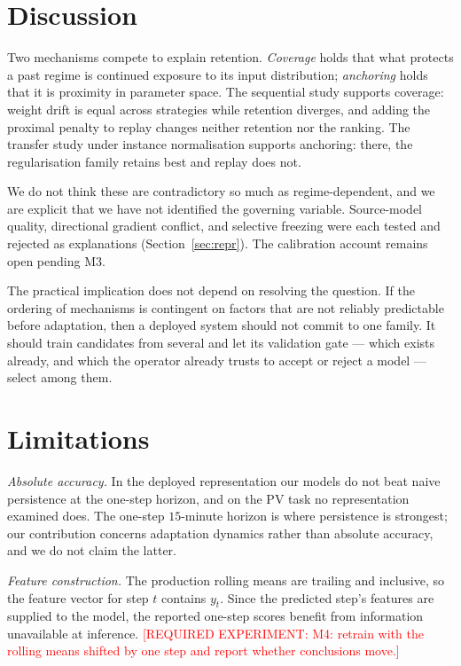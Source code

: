 \documentclass[journal]{IEEEtran}
\newcommand{\needexp}[1]{\textcolor{red}{[REQUIRED EXPERIMENT: #1]}}
\begin{document}
\section{Discussion}
\label{sec:discussion}

Two mechanisms compete to explain retention. \emph{Coverage} holds that what
protects a past regime is continued exposure to its input distribution;
\emph{anchoring} holds that it is proximity in parameter space. The sequential
study supports coverage: weight drift is equal across strategies while retention
diverges, and adding the proximal penalty to replay changes neither retention
nor the ranking. The transfer study under instance normalisation supports
anchoring: there, the regularisation family retains best and replay does not.

We do not think these are contradictory so much as regime-dependent, and we are
explicit that we have not identified the governing variable. Source-model
quality, directional gradient conflict, and selective freezing were each tested
and rejected as explanations (Section~\ref{sec:repr}). The calibration account
remains open pending M3.

The practical implication does not depend on resolving the question. If the
ordering of mechanisms is contingent on factors that are not reliably
predictable before adaptation, then a deployed system should not commit to one
family. It should train candidates from several and let its validation gate ---
which exists already, and which the operator already trusts to accept or reject
a model --- select among them.

\section{Limitations}
\label{sec:limits}

\emph{Absolute accuracy.} In the deployed representation our models do not beat
naive persistence at the one-step horizon, and on the PV task no representation
examined does. The one-step $15$-minute horizon is where persistence is
strongest; our contribution concerns adaptation dynamics rather than absolute
accuracy, and we do not claim the latter.

\emph{Feature construction.} The production rolling means are trailing and
inclusive, so the feature vector for step $t$ contains $y_t$. Since the
predicted step's features are supplied to the model, the reported one-step
scores benefit from information unavailable at inference.
\needexp{M4: retrain with the rolling means shifted by one step and report
whether conclusions move.}
\end{document}
